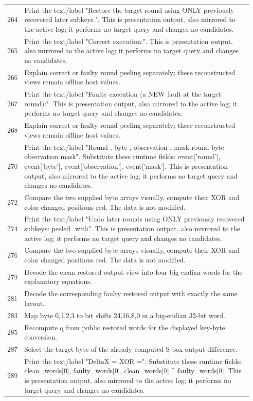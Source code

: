 \begin{longtable}{r >{\raggedright\arraybackslash}p{138mm}}
264&Print the text/label "Restore the target round using ONLY previously recovered later subkeys.". This is presentation output, also mirrored to the active log; it performs no target query and changes no candidates.\\
265&Print the text/label "Correct execution:". This is presentation output, also mirrored to the active log; it performs no target query and changes no candidates.\\
266&Explain correct or faulty round peeling separately; these reconstructed views remain offline host values.\\
267&Print the text/label "Faulty execution (a NEW fault at the target round):". This is presentation output, also mirrored to the active log; it performs no target query and changes no candidates.\\
268&Explain correct or faulty round peeling separately; these reconstructed views remain offline host values.\\
270&Print the text/label "Round  , byte  , observation  , mask  round byte observation mask". Substitute these runtime fields: event['round'], event['byte'], event['observation'], event['mask']. This is presentation output, also mirrored to the active log; it performs no target query and changes no candidates.\\
272&Compare the two supplied byte arrays visually, compute their XOR and color changed positions red. The data is not modified.\\
274&Print the text/label "Undo later rounds using ONLY previously recovered subkeys:  peeled\_with". This is presentation output, also mirrored to the active log; it performs no target query and changes no candidates.\\
276&Compare the two supplied byte arrays visually, compute their XOR and color changed positions red. The data is not modified.\\
279&Decode the clean restored output view into four big-endian words for the explanatory equations.\\
281&Decode the corresponding faulty restored output with exactly the same layout.\\
283&Map byte 0,1,2,3 to bit shifts 24,16,8,0 in a big-endian 32-bit word.\\
285&Recompute q from public restored words for the displayed key-byte conversion.\\
287&Select the target byte of the already computed S-box output difference.\\
289&Print the text/label "DeltaX =   XOR   =". Substitute these runtime fields: clean\_words[0], faulty\_words[0], clean\_words[0] \textasciicircum{} faulty\_words[0]. This is presentation output, also mirrored to the active log; it performs no target query and changes no candidates.\\

\end{longtable}
